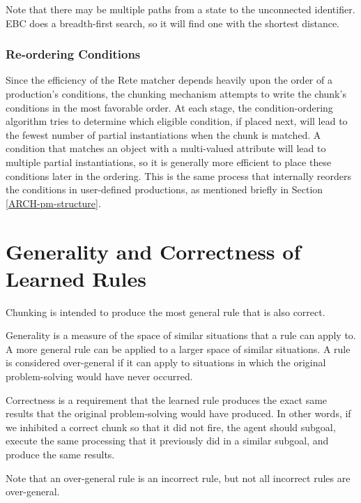 Note that there may be multiple paths from a state to the unconnected identifier.  EBC does a breadth-first search, so it will find one with the shortest distance.  

\subsubsection{Re-ordering Conditions}

Since the efficiency of the Rete matcher depends heavily upon the order of a production's conditions, the chunking mechanism attempts to write the chunk's conditions in the most favorable order. At each stage, the condition-ordering algorithm tries to determine which eligible condition, if placed next, will lead to the fewest number of partial instantiations when the chunk is matched. A condition that matches an object with a multi-valued attribute will lead to multiple partial instantiations, so it is generally more efficient to place these conditions later in the ordering.  This is the same process that internally reorders the conditions in user-defined productions, as mentioned briefly in Section \ref{ARCH-pm-structure}.


\section{Generality and Correctness of Learned Rules}
\label{CHUNKING-correctness}

Chunking is intended to produce the most general rule that is also correct. 

Generality is a measure of the space of similar situations that a rule can apply to.  A more general rule can be applied to a larger space of similar situations.  A rule is considered over-general if it can apply to situations in which the original problem-solving would have never occurred.  

Correctness is a requirement that the learned rule produces the exact same results that the original problem-solving would have produced.  In other words, if we inhibited a correct chunk so that it did not fire, the agent should subgoal, execute the same processing that it previously did in a similar subgoal, and produce the same results.

Note that an over-general rule is an incorrect rule, but not all incorrect rules are over-general.  


